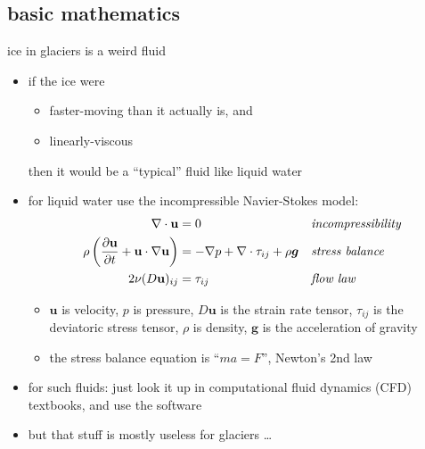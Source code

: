 \documentclass[10pt,dvipsnames]{beamer}
\newcommand{\bu}{\mathbf{u}}
\begin{document}
\subsection{basic mathematics}

\begin{frame}{ice in glaciers is a weird fluid}

\begin{itemize}
\item if the ice were
  \begin{itemize}
  \item[$\circ$] faster-moving than it actually is, and
  \item[$\circ$] linearly-viscous
  \end{itemize}

  then it would be a ``typical'' fluid like liquid water
\item for liquid water use the incompressible Navier-Stokes model:
\begin{align*}
\nabla \cdot \mathbf{u} &= 0 &&\text{\emph{incompressibility}} \\
\rho \left(\frac{\partial \bu}{\partial t} + \mathbf{u}\cdot\nabla \mathbf{u}\right) &= -\nabla p + \nabla \cdot \tau_{ij} + \rho \bm{g} &&\text{\emph{stress balance}} \\
2 \nu (D\mathbf{u})_{ij} &= \tau_{ij} &&\text{\emph{flow law}}
\end{align*}

    \begin{itemize}
    \item[$\circ$] $\bu$ is velocity, $p$ is pressure, $D\bu$ is the strain rate tensor, $\tau_{ij}$ is the deviatoric stress tensor, $\rho$ is density, $\bm{g}$ is the acceleration of gravity
    \item[$\circ$] the stress balance equation is ``$m a = F$'', Newton's 2nd law
    \end{itemize}
\item for such fluids: just look it up in computational fluid dynamics (CFD) textbooks, and use the software
\item but that stuff is mostly useless for glaciers \dots
\end{itemize}
\end{frame}
\end{document}
